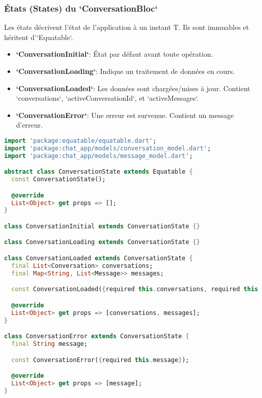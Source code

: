 \documentclass[12pt,a4paper]{article}
\begin{document}
\subsubsection{États (States) du `ConversationBloc`}
Les états décrivent l'état de l'application à un instant T. Ils sont immuables et héritent d'`Equatable`.
\begin{itemize}
    \item \textbf{`ConversationInitial`}: État par défaut avant toute opération.
    \item \textbf{`ConversationLoading`}: Indique un traitement de données en cours.
    \item \textbf{`ConversationLoaded`}: Les données sont chargées/mises à jour. Contient `conversations`, `activeConversationId`, et `activeMessages`.
    \item \textbf{`ConversationError`}: Une erreur est survenue. Contient un message d'erreur.
\end{itemize}

\begin{lstlisting}[language=Dart, caption=Définition des états du ConversationBloc (`conversation_state.dart`), style=dartstyle]
import 'package:equatable/equatable.dart';
import 'package:chat_app/models/conversation_model.dart';
import 'package:chat_app/models/message_model.dart';

abstract class ConversationState extends Equatable {
  const ConversationState();

  @override
  List<Object> get props => [];
}

class ConversationInitial extends ConversationState {}

class ConversationLoading extends ConversationState {}

class ConversationLoaded extends ConversationState {
  final List<Conversation> conversations;
  final Map<String, List<Message>> messages;

  const ConversationLoaded({required this.conversations, required this.messages});

  @override
  List<Object> get props => [conversations, messages];
}

class ConversationError extends ConversationState {
  final String message;

  const ConversationError({required this.message});

  @override
  List<Object> get props => [message];
}
\end{lstlisting}
\end{document}
